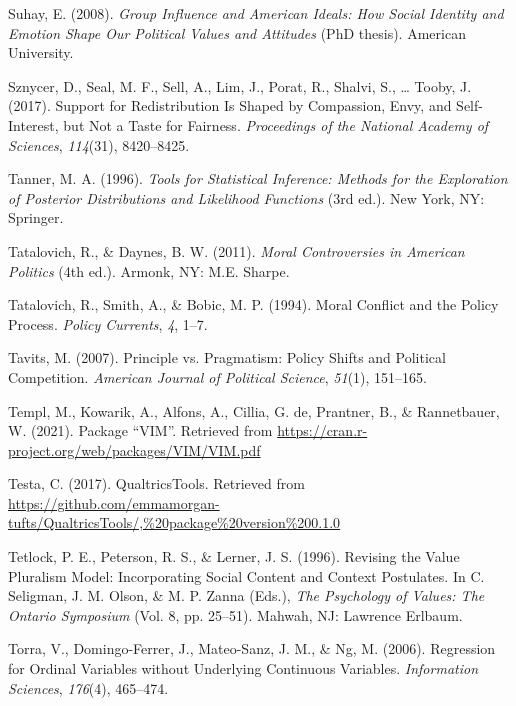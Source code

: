 \documentclass[12pt,econ]{sources/authesis}
\begin{document}
\leavevmode\hypertarget{ref-suhay_2008_group}{}%
Suhay, E. (2008). \emph{Group Influence and American Ideals: How Social Identity and Emotion Shape Our Political Values and Attitudes} (PhD thesis). American University.

\leavevmode\hypertarget{ref-sznycer_2017_support}{}%
Sznycer, D., Seal, M. F., Sell, A., Lim, J., Porat, R., Shalvi, S., \ldots{} Tooby, J. (2017). Support for Redistribution Is Shaped by Compassion, Envy, and Self-Interest, but Not a Taste for Fairness. \emph{Proceedings of the National Academy of Sciences}, \emph{114}(31), 8420--8425.

\leavevmode\hypertarget{ref-tanner_1996_tools}{}%
Tanner, M. A. (1996). \emph{Tools for Statistical Inference: Methods for the Exploration of Posterior Distributions and Likelihood Functions} (3rd ed.). New York, NY: Springer.

\leavevmode\hypertarget{ref-tatalovich_moral_2011}{}%
Tatalovich, R., \& Daynes, B. W. (2011). \emph{Moral Controversies in American Politics} (4th ed.). Armonk, NY: M.E. Sharpe.

\leavevmode\hypertarget{ref-tatalovich_moral_1994}{}%
Tatalovich, R., Smith, A., \& Bobic, M. P. (1994). Moral Conflict and the Policy Process. \emph{Policy Currents}, \emph{4}, 1--7.

\leavevmode\hypertarget{ref-tavits_2007_principle}{}%
Tavits, M. (2007). Principle vs. Pragmatism: Policy Shifts and Political Competition. \emph{American Journal of Political Science}, \emph{51}(1), 151--165.

\leavevmode\hypertarget{ref-templ_2021_package}{}%
Templ, M., Kowarik, A., Alfons, A., Cillia, G. de, Prantner, B., \& Rannetbauer, W. (2021). Package ``VIM''. Retrieved from \url{https://cran.r-project.org/web/packages/VIM/VIM.pdf}

\leavevmode\hypertarget{ref-testa_2017_qualtricstools}{}%
Testa, C. (2017). QualtricsTools. Retrieved from \url{https://github.com/emmamorgan-tufts/QualtricsTools/,\%20package\%20version\%200.1.0}

\leavevmode\hypertarget{ref-tetlock_1996_revising}{}%
Tetlock, P. E., Peterson, R. S., \& Lerner, J. S. (1996). Revising the Value Pluralism Model: Incorporating Social Content and Context Postulates. In C. Seligman, J. M. Olson, \& M. P. Zanna (Eds.), \emph{The Psychology of Values: The Ontario Symposium} (Vol. 8, pp. 25--51). Mahwah, NJ: Lawrence Erlbaum.

\leavevmode\hypertarget{ref-torra_2006_regression}{}%
Torra, V., Domingo-Ferrer, J., Mateo-Sanz, J. M., \& Ng, M. (2006). Regression for Ordinal Variables without Underlying Continuous Variables. \emph{Information Sciences}, \emph{176}(4), 465--474.
\end{document}

